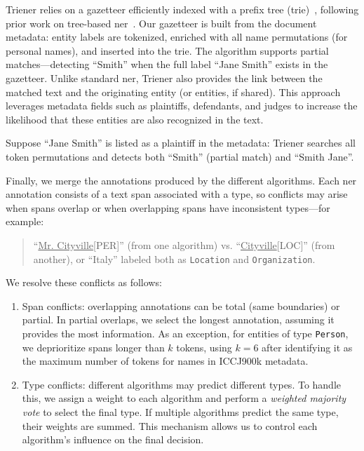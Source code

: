 Trie\ac{ner} relies on a gazetteer efficiently indexed with a prefix tree (trie)~\cite{s-yata-marisa-trie}, following prior work on tree-based \ac{ner}~\cite{Nguyen_tree_ner_2014}.  
Our gazetteer is built from the document metadata: entity labels are tokenized, enriched with all name permutations (for personal names), and inserted into the trie.  
The algorithm supports partial matches---\eg detecting ``Smith'' when the full label ``Jane Smith'' exists in the gazetteer.  
Unlike standard \ac{ner}, Trie\ac{ner} also provides the link between the matched text and the originating entity (or entities, if shared).  
This approach leverages metadata fields such as plaintiffs, defendants, and judges to increase the likelihood that these entities are also recognized in the text.

Suppose ``Jane Smith'' is listed as a plaintiff in the metadata: Trie\ac{ner} searches all token permutations and detects both ``Smith'' (partial match) and ``Smith Jane''.

Finally, we merge the annotations produced by the different algorithms.  
Each \ac{ner} annotation consists of a text span associated with a type, so conflicts may arise when spans overlap or when overlapping spans have inconsistent types---for example:
\begin{quote}
``\underline{Mr. Cityville}[PER]'' (from one algorithm) vs. ``\underline{Cityville}[LOC]'' (from another),  
or ``Italy'' labeled both as \texttt{Location} and \texttt{Organization}.
\end{quote}

We resolve these conflicts as follows:
\begin{enumerate}
    \item Span conflicts: overlapping annotations can be total (same boundaries) or partial.  
    In partial overlaps, we select the longest annotation, assuming it provides the most information.  
    As an exception, for entities of type \texttt{Person}, we deprioritize spans longer than $k$ tokens, using $k=6$ after identifying it as the maximum number of tokens for names in ICCJ900k metadata.
    \item Type conflicts: different algorithms may predict different types.  
    To handle this, we assign a weight to each algorithm and perform a \textit{weighted majority vote} to select the final type.  
    If multiple algorithms predict the same type, their weights are summed.  
    This mechanism allows us to control each algorithm's influence on the final decision.
\end{enumerate}



